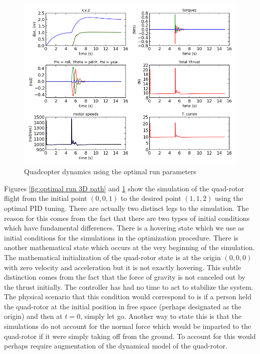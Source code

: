 \begin{figure}[htbp]
	\centering
		\includegraphics[width=\textwidth]{Figures/optimal_run_time_domain.png}
	\caption[Optimal Run Time Domain]{Quadcopter dynamics using the optimal run parameters}
	\label{fig:optimal run time domain}
\end{figure}

Figures \ref{fig:optimal run 3D path} and \ref{fig:optimal run time domain} show the simulation of the quad-rotor flight from the initial point $(0,0,1)$ to the desired point $(1,1,2)$ using the optimal PID tuning. There are actually two distinct legs to the simulation. The reason for this comes from the fact that there are two types of initial conditions which have fundamental differences. There is a hovering state which we use as initial conditions for the simulations in the optimization procedure. There is another mathematical state which occurs at the very beginning of the simulation. The mathematical initialization of the quad-rotor state is at the origin $(0,0,0)$ with zero velocity and acceleration but it is not exactly hovering. This subtle distinction comes from the fact that the force of gravity is not canceled out by the thrust initially. The controller has had no time to act to stabilize the system. The physical scenario that this condition would correspond to is if a person held the quad-rotor at the initial position in free space (perhaps designated as the origin) and then at $t=0$, simply let go. Another way to state this is that the simulations do not account for the normal force which would be imparted to the quad-rotor if it were simply taking off from the ground. To account for this would perhaps require augmentation of the dynamical model of the quad-rotor.

